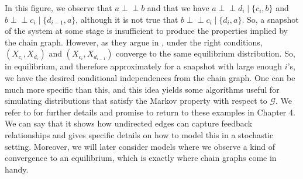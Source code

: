 \documentclass[11pt, a4paper]{memoir}
\theoremstyle{break}
\theoremstyle{break}
\theoremstyle{nonumberplain}
\newcommand{\indep}{\perp \!\!\! \perp}
\begin{document}
In this figure, we observe that $a\indep b$ and that we have $a\indep d_i\mid \{c_i,b\}$ and $b\indep c_i\mid\{d_{i-1},a\}$, although it is not true that $b\indep c_i\mid\{d_i,a\}$. So, a snapshot of the system at some stage is insufficient to produce the properties implied by the chain graph. However, as they argue in \cite{ChainGraph}, under the right conditions, $(X_{c_i},X_{d_i})$ and $(X_{c_i},X_{d_{i-1}})$ converge to the same equilibrium distribution. So, in equilibrium, and therefore approximately for a snapshot with large enough $i$'s, we have the desired conditional independences from the chain graph. One can be much more specific than this, and this idea yields some algorithms useful for simulating distributions that satisfy the Markov property with respect to $\mathcal{G}$. We refer to \cite{ChainGraph} for further details and promise to return to these examples in Chapter 4. We can say that it shows how undirected edges can capture feedback relationships and gives specific details on how to model this in a stochastic setting. Moreover, we will later consider models where we observe a kind of convergence to an equilibrium, which is exactly where chain graphs come in handy.
\end{document}
